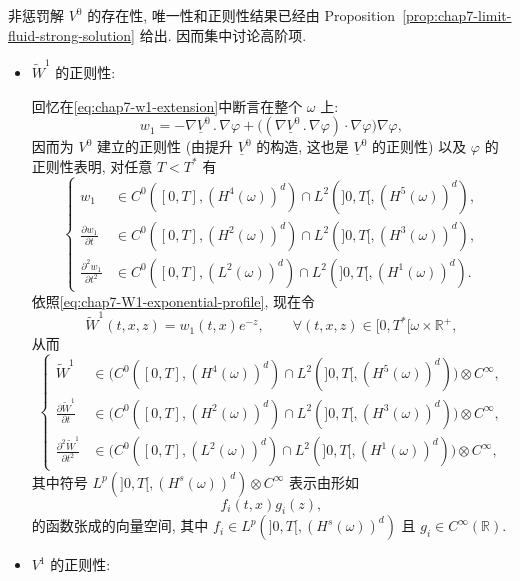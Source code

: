 \begin{sloppypar}
非惩罚解 $V^0$ 的存在性, 唯一性和正则性结果已经由 Proposition~\ref{prop:chap7-limit-fluid-strong-solution} 给出. 因而集中讨论高阶项.

\begin{itemize}
\item $\widetilde W^1$ 的正则性:

回忆在\eqref{eq:chap7-w1-extension}中断言在整个 $\omega$ 上:
\[
 w_1=-\nabla\underline V^0\mathbin{.}\nabla\varphi
 +\bigl((\nabla\underline V^0\mathbin{.}\nabla\varphi)\cdot\nabla\varphi\bigr)\nabla\varphi,
\]
因而为 $V^0$ 建立的正则性 (由提升 $\underline V^0$ 的构造, 这也是 $\underline V^0$ 的正则性) 以及 $\varphi$ 的正则性表明, 对任意 $T<T^*$ 有
\begin{equation}
\left\{
\begin{aligned}
 w_1&\in C^0([0,T],(H^4(\omega))^d)\cap L^2(]0,T[,(H^5(\omega))^d),\\
 \frac{\partial w_1}{\partial t}&\in C^0([0,T],(H^2(\omega))^d)\cap L^2(]0,T[,(H^3(\omega))^d),\\
 \frac{\partial^2w_1}{\partial t^2}&\in C^0([0,T],(L^2(\omega))^d)\cap L^2(]0,T[,(H^1(\omega))^d).
\end{aligned}
\right.
\label{eq:chap7-w1-regularity}
\end{equation}
依照\eqref{eq:chap7-W1-exponential-profile}, 现在令
\[
 \widetilde W^1(t,x,z)=w_1(t,x)e^{-z},
 \qquad\forall(t,x,z)\in[0,T^*[\omega\times\mathbb R^+,
\]
从而
\begin{equation}
\left\{
\begin{aligned}
 \widetilde W^1&\in\bigl(C^0([0,T],(H^4(\omega))^d)\cap L^2(]0,T[,(H^5(\omega))^d)\bigr)\otimes C^\infty,\\
 \frac{\partial\widetilde W^1}{\partial t}&\in\bigl(C^0([0,T],(H^2(\omega))^d)\cap L^2(]0,T[,(H^3(\omega))^d)\bigr)\otimes C^\infty,\\
 \frac{\partial^2\widetilde W^1}{\partial t^2}&\in\bigl(C^0([0,T],(L^2(\omega))^d)\cap L^2(]0,T[,(H^1(\omega))^d)\bigr)\otimes C^\infty,
\end{aligned}
\right.
\label{eq:chap7-W1-regularity}
\end{equation}
其中符号 $L^p(]0,T[,(H^s(\omega))^d)\otimes C^\infty$ 表示由形如
\[
 f_i(t,x)g_i(z),
\]
的函数张成的向量空间, 其中 $f_i\in L^p(]0,T[,(H^s(\omega))^d)$ 且 $g_i\in C^\infty(\mathbb R)$.

\item $V^1$ 的正则性:
\end{itemize}


\end{sloppypar}

